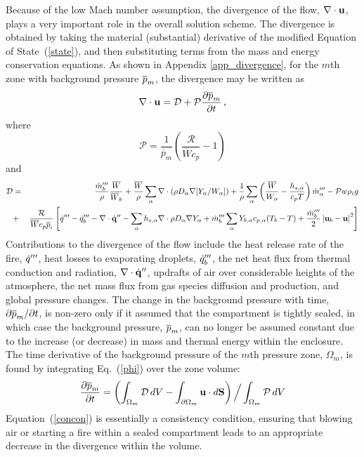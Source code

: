 \documentclass[11pt]{book}
\begin{document}
Because of the low Mach number assumption, the divergence of the flow, $\nabla \cdot {\bf u}$, plays a very important role in the overall solution scheme. The divergence is obtained by taking the material (substantial) derivative
of the modified Equation of State~(\ref{state}), and then substituting terms from the mass
and energy conservation equations. As shown in Appendix \ref{app_divergence}, for the $m$th zone with background pressure $\overline{p}_m$, the divergence may be written as
\begin{equation}
\label{eqn_divfromeos}
\nabla \cdot {\bf u} = {\cal D} + {\cal P}\frac{\partial \overline{p}_m}{\partial t} \,\mbox{,}  \label{phi}
\end{equation}
where
\begin{equation}
\label{eqn_fdsP1}
\mathcal{P} = \frac{1}{\overline{p}_m}\left( \frac{\mathcal{R}}{\overline{W} c_p} - 1 \right)
\end{equation}
and
\begin{eqnarray}
\label{eqn_fdsD1}
\mathcal{D} &=& \frac{\dot{m}_b^\tripleprime}{\rho}\frac{\overline{W}}{\overline{W}_b} + \frac{\overline{W}}{\rho} \sum_\alpha \Div \left( \rho D_\alpha \nabla[Y_\alpha/W_\alpha] \right) + \frac{1}{\rho}\sum_\alpha \left( \frac{\overline{W}}{W_\alpha} - \frac{h_{s,\alpha}}{c_p T} \right) \dot{m}_{\alpha}^\tripleprime  - \mathcal{P} w \rho_i g \nonumber \vspace{0.3cm} \\
&+& \frac{\mathcal{R}}{\overline{W} c_p \overline{p}_i} \left[ \dot{q}^\tripleprime - \dq_b''' - \Div \dot{\mathbf{q}}^{\prime\prime} - \sum_\alpha h_{s,\alpha} \Div \rho D_\alpha \nabla Y_\alpha + \dot{m}_{b}^{\tripleprime} \sum_\alpha Y_{b,\alpha} c_{p,\alpha}(T_b-T) + \frac{\dot{m}_{b}^{\tripleprime}}{2}\left|\mathbf{u}_b-\mathbf{u}\right|^2  \right] \nonumber \vspace{0.3cm} \\
\end{eqnarray}
Contributions to the divergence of the flow include the heat release rate of the fire, $\dot{q}'''$, heat losses to evaporating droplets,
$\dot{q}_b'''$, the net heat flux from thermal conduction and radiation, $\nabla \cdot \dot{\bf q}''$, updrafts of air over considerable heights of
the atmosphere, the net mass flux from gas species diffusion and production, and global pressure changes. The change in the background
pressure with time, $\partial \overline{p}_m/\partial t$, is non-zero only if
it assumed that the compartment is tightly sealed, in which case the background pressure, $\overline{p}_m$, can no longer be assumed constant due to
the increase (or decrease) in mass and thermal energy within the enclosure. The time derivative of the background pressure of the $m$th
pressure zone, $\Omega_m$, is found by integrating Eq.~(\ref{phi}) over the zone volume:
\begin{equation}
\frac{\partial \overline{p}_m}{\partial t} = \left( \int_{\Omega_m} {\cal D} \, dV - \int_{\partial \Omega_m} {\bf u} \cdot d{\bf S} \right) \Big/ \int_{\Omega_m} {\cal P} \, dV  \label{concon}
\end{equation}
Equation~(\ref{concon}) is essentially a consistency condition, ensuring that blowing air or starting a fire within a sealed
compartment leads to an appropriate decrease in the divergence within the volume.
\end{document}

